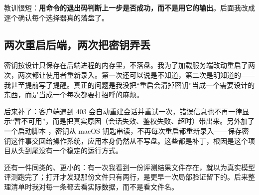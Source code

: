 教训很短：\textbf{用命令的退出码判断上一步是否成功，而不是用它的输出}。后面我改成逐个确认每个选择器真的落盘了。

\subsection{两次重启后端，两次把密钥弄丢}

密钥按设计只保存在后端进程的内存里，不落盘。我为了加载服务端改动重启了两次，两次都让使用者重新录入。第一次还可以说是不知道，第二次是明知道的——我甚至提前写了提醒。真正的问题是我没把“重启会清掉密钥”当成一个需要设计的东西，而是当成一个每次都要打招呼的麻烦。

后来补了：客户端遇到 403 会自动重建会话并重试一次，错误信息也不再一律显示“暂不可用”，而是把真实原因（会话失效、鉴权失败、超时）带出来。另外加了一个启动脚本 ，密钥从 macOS 钥匙串读，不再每次重启都重新录入——保存密钥这件事交回给操作系统，应用本身仍然从不写盘。这些都是补丁，根因是这个项目从头到尾没有一个稳定的运行方式。

还有一件同类的、更小的：有一次我看到一份评测结果文件存在，就以为真实模型评测跑完了；打开才发现那份文件只有两行，是更早一次局部验证留下的。后来整理清单时我对每一条都去看实际数据，而不是看文件名。
